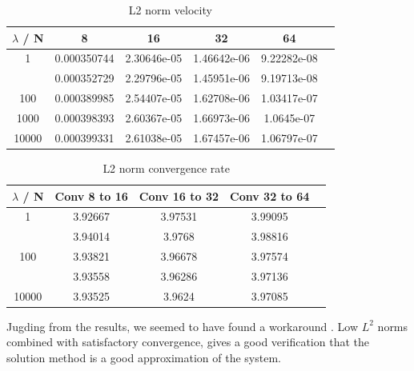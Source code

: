 \documentclass[a4paper,norsk]{article}
\begin{document}
\begin{table}[ht]
\caption {L2 norm velocity} 
\centering
\begin{tabular}{c|ccccc}
\hline
\rowcolor{LightCyan}
$\lambda$ / N  & 8 & 16 & 32 & 64\\
\hline
1     & 0.000350744 & 2.30646e-05 & 1.46642e-06 & 9.22282e-08 \\ \hline
\rowcolor{LightCyan} \hline
10    & 0.000352729 & 2.29796e-05 & 1.45951e-06 & 9.19713e-08 \\ \hline
100   & 0.000389985 & 2.54407e-05 & 1.62708e-06 & 1.03417e-07 \\ \hline
\rowcolor{LightCyan} 
1000  & 0.000398393 & 2.60367e-05 & 1.66973e-06 & 1.0645e-07  \\ \hline
10000 & 0.000399331 & 2.61038e-05 & 1.67457e-06 & 1.06797e-07 \\
\hline
\end{tabular}
\end{table}

\begin{table}[ht]
\caption {L2 norm convergence rate} 
\centering
\begin{tabular}{c|cccc}
\hline
\rowcolor{LightCyan}
$\lambda$ / N  & Conv 8 to 16  &  Conv 16 to 32 &  Conv 32 to 64 \\
\hline
1     & 3.92667 & 3.97531 & 3.99095 &  \\ \hline
\rowcolor{LightCyan} \hline
10    & 3.94014 & 3.9768  & 3.98816 &  \\ \hline
100   & 3.93821 & 3.96678 & 3.97574 &  \\ \hline
\rowcolor{LightCyan} \hline
1000  & 3.93558 & 3.96286 & 3.97136 &  \\ \hline
10000 & 3.93525 & 3.9624  & 3.97085 &  \\
\hline
\end{tabular}
\end{table}
Jugding from the results, we seemed to have found a workaround . Low $L^2$ norms combined with satisfactory
convergence, gives a good verification that the solution method is a good approximation of the system. 
	
\end{document}
